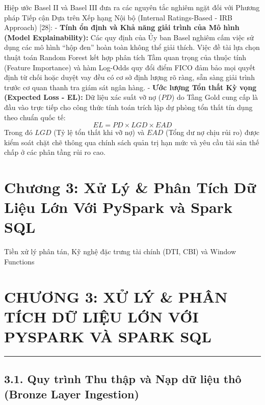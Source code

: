 \documentclass[
  13pt,
  a4paper,
]{report}
\begin{document}
Hiệp ước Basel II và Basel III đưa ra các nguyên tắc nghiêm ngặt đối với
Phương pháp Tiếp cận Dựa trên Xếp hạng Nội bộ (Internal Ratings-Based -
IRB Approach) {[}28{]}: - \textbf{Tính ổn định và Khả năng giải trình
của Mô hình (Model Explainability):} Các quy định của Ủy ban Basel
nghiêm cấm việc sử dụng các mô hình ``hộp đen'' hoàn toàn không thể giải
thích. Việc đề tài lựa chọn thuật toán Random Forest kết hợp phân tích
Tầm quan trọng của thuộc tính (Feature Importance) và hàm Log-Odds quy
đổi điểm FICO đảm bảo mọi quyết định từ chối hoặc duyệt vay đều có cơ sở
định lượng rõ ràng, sẵn sàng giải trình trước cơ quan thanh tra giám sát
ngân hàng. - \textbf{Ước lượng Tổn thất Kỳ vọng (Expected Loss - EL):}
Dữ liệu xác suất vỡ nợ (\(PD\)) do Tầng Gold cung cấp là đầu vào trực
tiếp cho công thức tính toán trích lập dự phòng tổn thất tín dụng theo
chuẩn quốc tế: \[EL = PD \times LGD \times EAD\] Trong đó \(LGD\) (Tỷ lệ
tổn thất khi vỡ nợ) và \(EAD\) (Tổng dư nợ chịu rủi ro) được kiểm soát
chặt chẽ thông qua chính sách quản trị hạn mức và yêu cầu tài sản thế
chấp ở các phân tầng rủi ro cao.


\chapter{Chương 3: Xử Lý \& Phân Tích Dữ Liệu Lớn Với PySpark và Spark
SQL}\label{chux1b0ux1a1ng-3-xux1eed-luxfd-phuxe2n-tuxedch-dux1eef-liux1ec7u-lux1edbn-vux1edbi-pyspark-vuxe0-spark-sql}

Tiền xử lý phân tán, Kỹ nghệ đặc trưng tài chính (DTI, CBI) và Window
Functions

\hfill\break


\chapter{CHƯƠNG 3: XỬ LÝ \& PHÂN TÍCH DỮ LIỆU LỚN VỚI PYSPARK VÀ SPARK
SQL}\label{chux1b0ux1a1ng-3-xux1eed-luxfd-phuxe2n-tuxedch-dux1eef-liux1ec7u-lux1edbn-vux1edbi-pyspark-vuxe0-spark-sql-1}

\begin{center}\rule{0.5\linewidth}{0.5pt}\end{center}

\section{3.1. Quy trình Thu thập và Nạp dữ liệu thô (Bronze Layer
Ingestion)}\label{quy-truxecnh-thu-thux1eadp-vuxe0-nux1ea1p-dux1eef-liux1ec7u-thuxf4-bronze-layer-ingestion}
\end{document}
